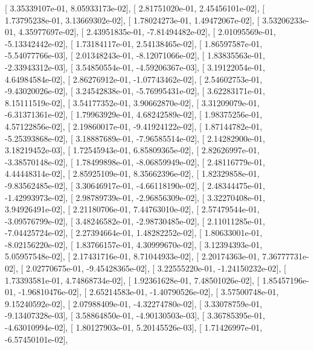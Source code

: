 \documentclass{article}
\begin{document}
       [  3.35339107e-01,   8.05933173e-02],
       [  2.81751020e-01,   2.45456101e-02],
       [  1.73795238e-01,   3.13669302e-02],
       [  1.78024273e-01,   1.49472067e-02],
       [  3.53206233e-01,   4.35977697e-02],
       [  2.43951835e-01,  -7.81494482e-02],
       [  2.01095569e-01,  -5.13342442e-02],
       [  1.73184117e-01,   2.54138465e-02],
       [  1.86597587e-01,  -5.54077766e-03],
       [  2.01348243e-01,  -8.12071066e-02],
       [  1.83835563e-01,  -2.33943312e-03],
       [  3.54850554e-01,  -4.59206367e-03],
       [  3.19122054e-01,   4.64984584e-02],
       [  2.86276912e-01,  -1.07743462e-02],
       [  2.54602753e-01,  -9.43020026e-02],
       [  3.24542838e-01,  -5.76995431e-02],
       [  3.62283171e-01,   8.15111519e-02],
       [  3.54177352e-01,   3.90662870e-02],
       [  3.31209079e-01,  -6.31371361e-02],
       [  1.79963929e-01,   4.68242589e-02],
       [  1.98375256e-01,   4.57122856e-02],
       [  2.19860017e-01,  -9.41924122e-02],
       [  1.87144782e-01,  -5.25393868e-02],
       [  3.18887689e-01,  -7.96585514e-02],
       [  2.14282900e-01,   3.18219452e-03],
       [  1.72545943e-01,   6.85809365e-02],
       [  2.82626997e-01,  -3.38570148e-02],
       [  1.78499898e-01,  -8.06859949e-02],
       [  2.48116779e-01,   4.44448314e-02],
       [  2.85925109e-01,   8.35662396e-02],
       [  1.82329858e-01,  -9.83562485e-02],
       [  3.30646917e-01,  -4.66118190e-02],
       [  2.48344475e-01,  -1.42993973e-02],
       [  2.98789739e-01,  -2.96856309e-02],
       [  3.32270408e-01,   3.94926491e-02],
       [  2.21180706e-01,   7.44763010e-02],
       [  2.57479544e-01,  -3.09576799e-02],
       [  3.48246582e-01,  -2.98730485e-02],
       [  2.11011285e-01,  -7.04425724e-02],
       [  2.27394664e-01,   1.48282252e-02],
       [  1.80633001e-01,  -8.02156220e-02],
       [  1.83766157e-01,   4.30999670e-02],
       [  3.12394393e-01,   5.05957548e-02],
       [  2.17431716e-01,   8.71044933e-02],
       [  2.20174363e-01,   7.36777731e-02],
       [  2.02770675e-01,  -9.45428365e-02],
       [  3.22555220e-01,  -1.24150232e-02],
       [  1.73393581e-01,   4.74868734e-02],
       [  1.92361628e-01,   7.48501026e-02],
       [  1.85457196e-01,  -1.96810476e-02],
       [  2.65214583e-01,  -1.40790526e-02],
       [  3.57500748e-01,   9.15240592e-02],
       [  2.07988409e-01,  -4.32274780e-02],
       [  3.33078759e-01,  -9.13407328e-03],
       [  3.58864850e-01,  -4.90130503e-03],
       [  3.36785395e-01,  -4.63010994e-02],
       [  1.80127903e-01,   5.20145526e-03],
       [  1.71426997e-01,  -6.57450101e-02],
\end{document}
